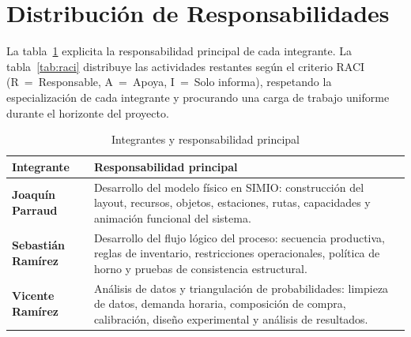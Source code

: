 \documentclass[12pt]{article}
\begin{document}
\newpage
\section{Distribución de Responsabilidades}

La tabla~\ref{tab:responsabilidades-principales} explicita la responsabilidad principal de cada integrante. La tabla~\ref{tab:raci} distribuye las actividades restantes según el criterio RACI (R~=~Responsable, A~=~Apoya, I~=~Solo informa), respetando la especialización de cada integrante y procurando una carga de trabajo uniforme durante el horizonte del proyecto.

\begin{table}[h!]
\centering
\caption{Integrantes y responsabilidad principal}
\label{tab:responsabilidades-principales}
\renewcommand{\arraystretch}{1.25}
\begin{tabularx}{\textwidth}{>{\bfseries}p{3.2cm}X}
\toprule
\rowcolor{tabhead}
\color{white}\textbf{Integrante} & \color{white}\textbf{Responsabilidad principal} \\
\midrule
\rowcolor{tabrow}
Joaquín Parraud & Desarrollo del modelo físico en SIMIO: construcción del layout, recursos, objetos, estaciones, rutas, capacidades y animación funcional del sistema. \\
Sebastián Ramírez & Desarrollo del flujo lógico del proceso: secuencia productiva, reglas de inventario, restricciones operacionales, política de horno y pruebas de consistencia estructural. \\
\rowcolor{tabrow}
Vicente Ramírez & Análisis de datos y triangulación de probabilidades: limpieza de datos, demanda horaria, composición de compra, calibración, diseño experimental y análisis de resultados. \\
\bottomrule
\end{tabularx}
\end{table}
\end{document}

